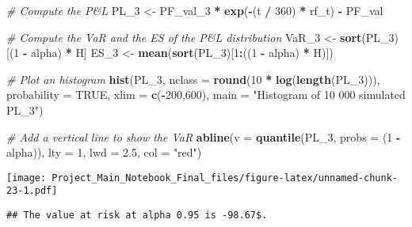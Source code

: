 \documentclass[]{article}
\newenvironment{Shaded}{\begin{snugshade}}{\end{snugshade}}
\newcommand{\CommentTok}[1]{\textcolor[rgb]{0.56,0.35,0.01}{\textit{#1}}}
\newcommand{\DataTypeTok}[1]{\textcolor[rgb]{0.13,0.29,0.53}{#1}}
\newcommand{\DecValTok}[1]{\textcolor[rgb]{0.00,0.00,0.81}{#1}}
\newcommand{\FloatTok}[1]{\textcolor[rgb]{0.00,0.00,0.81}{#1}}
\newcommand{\KeywordTok}[1]{\textcolor[rgb]{0.13,0.29,0.53}{\textbf{#1}}}
\newcommand{\NormalTok}[1]{#1}
\newcommand{\OperatorTok}[1]{\textcolor[rgb]{0.81,0.36,0.00}{\textbf{#1}}}
\newcommand{\OtherTok}[1]{\textcolor[rgb]{0.56,0.35,0.01}{#1}}
\newcommand{\StringTok}[1]{\textcolor[rgb]{0.31,0.60,0.02}{#1}}
\begin{document}
\begin{Shaded}
\begin{Highlighting}[]
\CommentTok{\# Compute the P\&L}
\NormalTok{PL\_}\DecValTok{3}\NormalTok{ <{-}}\StringTok{ }\NormalTok{PF\_val\_}\DecValTok{3} \OperatorTok{*}\StringTok{ }\KeywordTok{exp}\NormalTok{(}\OperatorTok{{-}}\NormalTok{(t }\OperatorTok{/}\StringTok{ }\DecValTok{360}\NormalTok{) }\OperatorTok{*}\StringTok{ }\NormalTok{rf\_t) }\OperatorTok{{-}}\StringTok{ }\NormalTok{PF\_val}

\CommentTok{\# Compute the VaR and the ES of the P\&L distribution}
\NormalTok{VaR\_}\DecValTok{3}\NormalTok{ <{-}}\StringTok{ }\KeywordTok{sort}\NormalTok{(PL\_}\DecValTok{3}\NormalTok{)[(}\DecValTok{1} \OperatorTok{{-}}\StringTok{ }\NormalTok{alpha) }\OperatorTok{*}\StringTok{ }\NormalTok{H]}
\NormalTok{ES\_}\DecValTok{3}\NormalTok{  <{-}}\StringTok{ }\KeywordTok{mean}\NormalTok{(}\KeywordTok{sort}\NormalTok{(PL\_}\DecValTok{3}\NormalTok{)[}\DecValTok{1}\OperatorTok{:}\NormalTok{((}\DecValTok{1} \OperatorTok{{-}}\StringTok{ }\NormalTok{alpha) }\OperatorTok{*}\StringTok{ }\NormalTok{H)])}

\CommentTok{\# Plot an histogram}
\KeywordTok{hist}\NormalTok{(PL\_}\DecValTok{3}\NormalTok{, }\DataTypeTok{nclass =} \KeywordTok{round}\NormalTok{(}\DecValTok{10} \OperatorTok{*}\StringTok{ }\KeywordTok{log}\NormalTok{(}\KeywordTok{length}\NormalTok{(PL\_}\DecValTok{3}\NormalTok{))), }
           \DataTypeTok{probability =} \OtherTok{TRUE}\NormalTok{, }\DataTypeTok{xlim =} \KeywordTok{c}\NormalTok{(}\OperatorTok{{-}}\DecValTok{200}\NormalTok{,}\DecValTok{600}\NormalTok{),}
           \DataTypeTok{main =} \StringTok{"Histogram of 10 000 simulated PL\_3"}\NormalTok{)}

\CommentTok{\# Add a vertical line to show the VaR}
\KeywordTok{abline}\NormalTok{(}\DataTypeTok{v   =} \KeywordTok{quantile}\NormalTok{(PL\_}\DecValTok{3}\NormalTok{, }\DataTypeTok{probs =}\NormalTok{ (}\DecValTok{1} \OperatorTok{{-}}\StringTok{ }\NormalTok{alpha)),}
       \DataTypeTok{lty =} \DecValTok{1}\NormalTok{,}
       \DataTypeTok{lwd =} \FloatTok{2.5}\NormalTok{,}
       \DataTypeTok{col =} \StringTok{"red"}\NormalTok{)}
\end{Highlighting}
\end{Shaded}

\texttt{[image: Project\_Main\_Notebook\_Final\_files/figure-latex/unnamed-chunk-23-1.pdf]}

\begin{verbatim}
## The value at risk at alpha 0.95 is -98.67$.
\end{verbatim}
\end{document}
